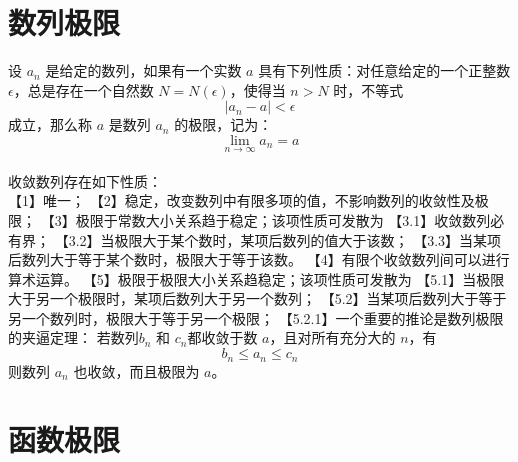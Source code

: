 \documentclass{ctexart}
\begin{document}
\section{数列极限}
设 ${a_n}$ 是给定的数列，如果有一个实数 $a$ 具有下列性质：对任意给定的一个正整数 $\epsilon$，总是存在一个自然数 $N = N(\epsilon)$，使得当 $n > N$ 时，不等式$$
\lvert a_n - a \rvert < \epsilon
$$成立，那么称 $a$ 是数列 ${a_n}$ 的极限，记为：$$
\lim_{n \to \infty} a_n = a
$$\\

收敛数列存在如下性质：\\

【1】唯一；
【2】稳定，改变数列中有限多项的值，不影响数列的收敛性及极限；
【3】极限于常数大小关系趋于稳定；该项性质可发散为
【3.1】收敛数列必有界；
【3.2】当极限大于某个数时，某项后数列的值大于该数；
【3.3】当某项后数列大于等于某个数时，极限大于等于该数。
【4】有限个收敛数列间可以进行算术运算。
【5】极限于极限大小关系趋稳定；该项性质可发散为
【5.1】当极限大于另一个极限时，某项后数列大于另一个数列；
【5.2】当某项后数列大于等于另一个数列时，极限大于等于另一个极限；
【5.2.1】一个重要的推论是数列极限的夹逼定理：
若数列${b_n}$ 和 ${c_n}$都收敛于数 $a$，且对所有充分大的 $n$，有$$
b_n \leq a_n \leq c_n
$$则数列 ${a_n}$ 也收敛，而且极限为 $a$。
\section{函数极限}
\end{document}
